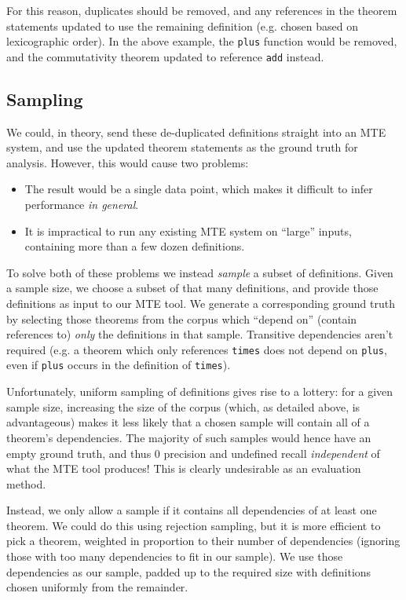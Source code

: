 For this reason, duplicates should be removed, and any references in the theorem
statements updated to use the remaining definition (e.g. chosen based on
lexicographic order). In the above example, the \texttt{plus} function would be
removed, and the commutativity theorem updated to reference \texttt{add}
instead.

\subsection{Sampling}

We could, in theory, send these de-duplicated definitions straight into an MTE
system, and use the updated theorem statements as the ground truth for analysis.
However, this would cause two problems:

\begin{itemize}
\item The result would be a single data point, which makes it difficult to
  infer performance \emph{in general}.
\item It is impractical to run any existing MTE system on ``large'' inputs,
  containing more than a few dozen definitions.
\end{itemize}

To solve both of these problems we instead \emph{sample} a subset of
definitions. Given a sample size, we choose a subset of that many definitions,
and provide those definitions as input to our MTE tool. We generate a
corresponding ground truth by selecting those theorems from the corpus which
``depend on'' (contain references to) \emph{only} the definitions in that
sample. Transitive dependencies aren't required (e.g. a theorem which only
references \texttt{times} does not depend on \texttt{plus}, even if
\texttt{plus} occurs in the definition of \texttt{times}).

Unfortunately, uniform sampling of definitions gives rise to a lottery: for a
given sample size, increasing the size of the corpus (which, as detailed above,
is advantageous) makes it less likely that a chosen sample will contain all of
a theorem's dependencies. The majority of such samples would hence have an empty
ground truth, and thus $0$ precision and undefined recall \emph{independent} of
what the MTE tool produces! This is clearly undesirable as an evaluation
method.

Instead, we only allow a sample if it contains all dependencies of at least one
theorem. We could do this using rejection sampling, but it is more efficient to
pick a theorem, weighted in proportion to their number of dependencies (ignoring
those with too many dependencies to fit in our sample). We use those
dependencies as our sample, padded up to the required size with definitions
chosen uniformly from the remainder.

